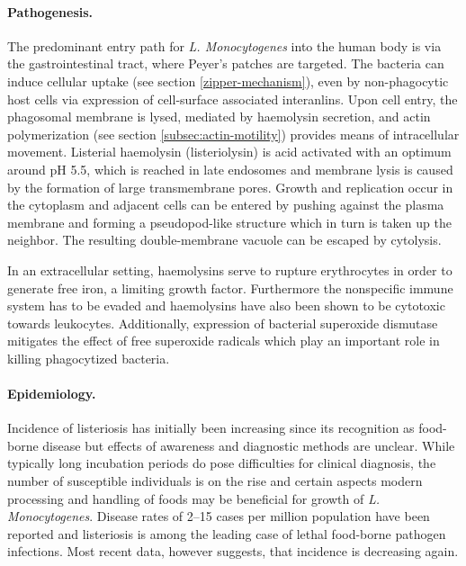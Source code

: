 \paragraph{Pathogenesis.}
The predominant entry path for \textit{L. Monocytogenes} into the human body is via the gastrointestinal tract, where Peyer's patches are targeted. The bacteria can induce cellular uptake (see section \ref{zipper-mechanism}), even by non-phagocytic host cells via expression of cell-surface associated interanlins. Upon cell entry, the phagosomal membrane is lysed, mediated by haemolysin secretion, and actin polymerization (see section \ref{subsec:actin-motility}) provides means of intracellular movement. Listerial haemolysin (listeriolysin) is acid activated with an optimum around pH 5.5, which is reached in late endosomes and membrane lysis is caused by the formation of large transmembrane pores. Growth and replication occur in the cytoplasm and adjacent cells can be entered by pushing against the plasma membrane and forming a pseudopod-like structure which in turn is taken up the neighbor. The resulting double-membrane vacuole can be escaped by cytolysis.

In an extracellular setting, haemolysins serve to rupture erythrocytes in order to generate free iron, a limiting growth factor. Furthermore the nonspecific immune system has to be evaded and haemolysins have also been shown to be cytotoxic towards leukocytes. Additionally, expression of bacterial superoxide dismutase mitigates the effect of free superoxide radicals which play an important role in killing phagocytized bacteria.

\paragraph{Epidemiology.}
Incidence of listeriosis has initially been increasing since its recognition as food-borne disease but effects of awareness and diagnostic methods are unclear. While typically long incubation periods do pose difficulties for clinical diagnosis, the number of susceptible individuals is on the rise and certain aspects modern processing and handling of foods may be beneficial for growth of \textit{L. Monocytogenes}. Disease rates of 2--15 cases per million population have been reported and listeriosis is among the leading case of lethal food-borne pathogen infections. Most recent data, however suggests, that incidence is decreasing again.

